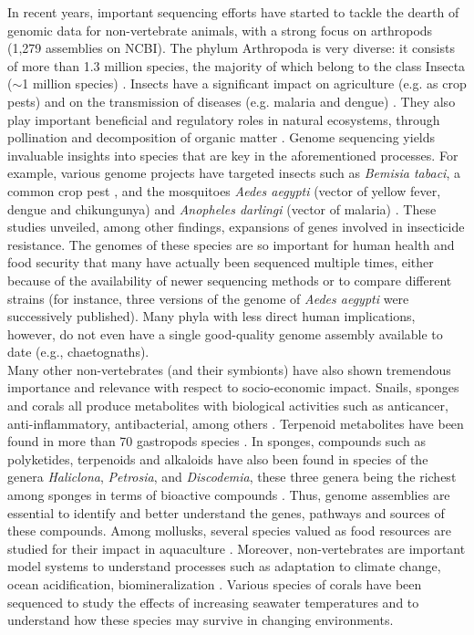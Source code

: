 In recent years, important sequencing efforts have started to tackle the dearth of genomic data for non-vertebrate animals, with a strong focus on arthropods (1,279 assemblies on NCBI). The phylum Arthropoda is very diverse: it consists of more than 1.3 million species, the majority of which belong to the class Insecta ($\sim$1 million species) \cite{Zhang2013}. Insects have a significant impact on agriculture (e.g. as crop pests) and on the transmission of diseases (e.g. malaria and dengue) \cite{li2019}. They also play important beneficial and regulatory roles in natural ecosystems, through pollination and decomposition of organic matter \cite{noriega2018}. Genome sequencing yields invaluable insights into species that are key in the aforementioned processes. For example, various genome projects have targeted insects such as \textit{Bemisia tabaci}, a common crop pest \cite{chen2016}, and the mosquitoes \textit{Aedes aegypti} (vector of yellow fever, dengue and chikungunya) \cite{aedes_aegypti3} and \textit{Anopheles darlingi} (vector of malaria) \cite{marinotti2013}. These studies unveiled, among other findings, expansions of genes involved in insecticide resistance. The genomes of these species are so important for human health and food security that many have actually been sequenced multiple times, either because of the availability of newer sequencing methods or to compare different strains (for instance, three versions of the genome of \textit{Aedes aegypti} \cite{aedes_aegypti, 3d-dna, aedes_aegypti3} were successively published). Many phyla with less direct human implications, however, do not even have a single good-quality genome assembly available to date (e.g., chaetognaths). \\ 

Many other non-vertebrates (and their symbionts) have also shown tremendous importance and relevance with respect to socio-economic impact. Snails, sponges and corals all produce metabolites with biological activities such as anticancer, anti-inflammatory, antibacterial, among others \cite{carroll2021, khalifa2019, ng2015}. Terpenoid metabolites have been found in more than 70 gastropods species \cite{avila2020}. In sponges, compounds such as polyketides, terpenoids and alkaloids have also been found in species of the genera \textit{Haliclona}, \textit{Petrosia}, and \textit{Discodemia}, these three genera being the richest among sponges in terms of bioactive compounds \cite{Han2019}. Thus, genome assemblies are essential to identify and better understand the genes, pathways and sources of these compounds. Among mollusks, several species valued as food resources are studied for their impact in aquaculture \cite{takeuchi2017}. Moreover, non-vertebrates are important model systems to understand processes such as adaptation to climate change, ocean acidification, biomineralization \cite{prather2013, gomes2020, conci2021, clark2020}. Various species of corals \cite{shinzato2011, mao2018, fuller2020, shinzato2021} have been sequenced to study the effects of increasing seawater temperatures and to understand how these species may survive in changing environments.  \\

